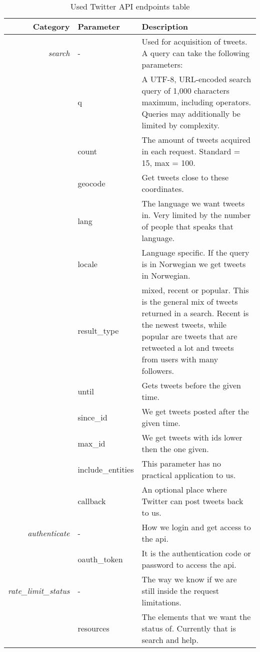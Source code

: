 \begin{table}
\centering
\label{tbl:twitterAPIendpoints}
\caption{Used Twitter API endpoints table}
\begin{tabular}{ r l | p{7cm} }
Category & Parameter & Description\\
\hline

\textit{search} & - & Used for acquisition of tweets. A query can take the
following parameters: \\
& q & A UTF-8, URL-encoded search query of 1,000 characters maximum,
including operators. Queries may additionally be limited by complexity. \\
& count & The amount of tweets acquired in each request. Standard =
15, max = 100. \\
& geocode & Get tweets close to these coordinates. \\
& lang & The language we want tweets in. Very limited by the number of people that speaks that language. \\
& locale & Language specific. If the query is in Norwegian we get tweets in Norwegian.\\
& result\_type & mixed, recent or popular. This is the general mix of tweets
returned in a search. Recent is the newest tweets, while popular are tweets that
are retweeted a lot and tweets from users with many followers. \\
& until & Gets tweets before the given time. \\
& since\_id & We get tweets posted after the given time. \\
& max\_id & We get tweets with ids lower then the one given. \\
& include\_entities & This parameter has no practical application to us. \\
& callback & An optional place where Twitter can post tweets back to us. \\

\hline
\textit{authenticate} & - & How we login and get access to the api. \\
& oauth\_token & It is the authentication code or password to access
the api. \\

\hline
\textit{rate\_limit\_status} & - & The way we know if we are still inside
the request limitations. \\
& resources & The elements that we want the status of. Currently that
is search and help. \\ 

\end{tabular}
\end{table}
%

